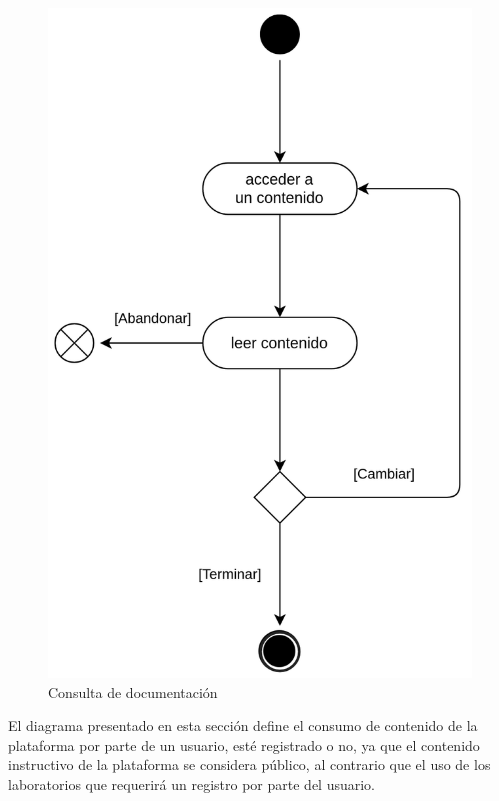             \begin{figure}[h]
                \centering
                
                \includegraphics[scale=0.20]{images/Diagramas/Actividades y transiciones 3.png}

                \caption{Consulta de documentación}
                \label{fig:consulta-documentacion}
            \end{figure}
            
            El diagrama presentado en esta sección define el consumo de contenido de la plataforma por parte de un usuario, esté registrado o no, ya que el contenido instructivo de la plataforma se considera público, al contrario que el uso de los laboratorios que requerirá un registro por parte del usuario.
            
